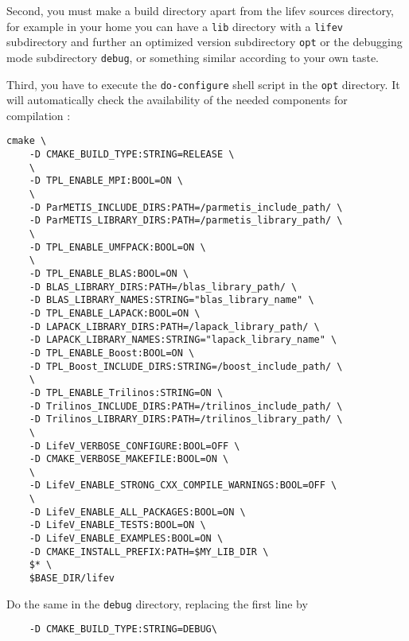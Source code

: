 Second, you must make a build directory apart from the
lifev sources directory, for example in your home you can have a
\verb!lib! directory with a \verb!lifev! subdirectory and further
an optimized version subdirectory \verb!opt! or the debugging mode
subdirectory \verb!debug!, or something similar according to your own taste.


Third, you have to execute the
\verb+do-configure+ shell script in the \verb!opt! directory.
It will automatically check the availability of the needed components
for \lifev compilation :


\begin{verbatim}
cmake \
    -D CMAKE_BUILD_TYPE:STRING=RELEASE \
    \
    -D TPL_ENABLE_MPI:BOOL=ON \
    \
    -D ParMETIS_INCLUDE_DIRS:PATH=/parmetis_include_path/ \
    -D ParMETIS_LIBRARY_DIRS:PATH=/parmetis_library_path/ \
    \
    -D TPL_ENABLE_UMFPACK:BOOL=ON \
    \
    -D TPL_ENABLE_BLAS:BOOL=ON \
    -D BLAS_LIBRARY_DIRS:PATH=/blas_library_path/ \
    -D BLAS_LIBRARY_NAMES:STRING="blas_library_name" \
    -D TPL_ENABLE_LAPACK:BOOL=ON \
    -D LAPACK_LIBRARY_DIRS:PATH=/lapack_library_path/ \
    -D LAPACK_LIBRARY_NAMES:STRING="lapack_library_name" \
    -D TPL_ENABLE_Boost:BOOL=ON \
    -D TPL_Boost_INCLUDE_DIRS:STRING=/boost_include_path/ \
    \
    -D TPL_ENABLE_Trilinos:STRING=ON \
    -D Trilinos_INCLUDE_DIRS:PATH=/trilinos_include_path/ \
    -D Trilinos_LIBRARY_DIRS:PATH=/trilinos_library_path/ \
    \
    -D LifeV_VERBOSE_CONFIGURE:BOOL=OFF \
    -D CMAKE_VERBOSE_MAKEFILE:BOOL=ON \
    \
    -D LifeV_ENABLE_STRONG_CXX_COMPILE_WARNINGS:BOOL=OFF \
    \
    -D LifeV_ENABLE_ALL_PACKAGES:BOOL=ON \
    -D LifeV_ENABLE_TESTS:BOOL=ON \
    -D LifeV_ENABLE_EXAMPLES:BOOL=ON \
    -D CMAKE_INSTALL_PREFIX:PATH=$MY_LIB_DIR \
    $* \
    $BASE_DIR/lifev
\end{verbatim}

Do the same in the \verb!debug! directory, replacing the first line by  \begin{verbatim}    -D CMAKE_BUILD_TYPE:STRING=DEBUG\  \end{verbatim}



